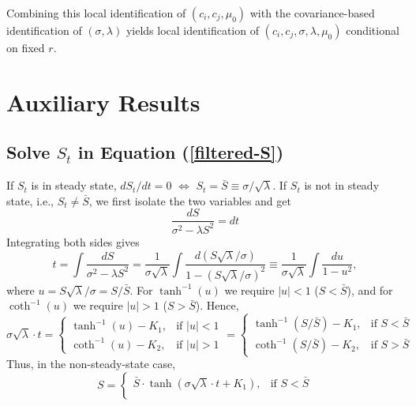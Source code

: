 \documentclass[mnsc]{informs3}
\begin{document}
\begin{APPENDICES}
Combining this local identification of $(c_i,c_j,\mu_0)$ with the covariance-based identification of $(\sigma,\lambda)$ yields local identification of $(c_i,c_j,\sigma,\lambda,\mu_0)$ conditional on fixed $r$.
\Halmos
\endproof






\section{Auxiliary Results}

\subsection{Solve $S_t$ in Equation (\ref{filtered-S})}\label{app-S-equ}

If $S_t$ is in steady state, $dS_t/dt = 0$ $\Leftrightarrow$ $S_t = \bar{S} \equiv \sigma/\sqrt{\lambda}$.
If $S_t$ is not in steady state, i.e., $S_t\neq\bar{S}$, we first isolate the two variables and get
\begin{equation*}
	\frac{dS}{\sigma^2-\lambda S^2} = dt
\end{equation*}
Integrating both sides gives
\begin{equation*}
    t = \int \frac{dS}{\sigma^2-\lambda S^2}
    = \frac{1}{\sigma\sqrt{\lambda}}
    \int \frac{d(S\sqrt{\lambda}/\sigma)}{1-(S\sqrt{\lambda}/\sigma)^2}
    \equiv \frac{1}{\sigma\sqrt{\lambda}}\int \frac{du}{1-u^2},
\end{equation*}
where $u = S\sqrt{\lambda}/\sigma = S/\bar{S}$.
For $\tanh^{-1}(u)$ we require $|u|<1$ ($S<\bar S$), and for $\coth^{-1}(u)$ we require $|u|>1$ ($S>\bar S$).
Hence,
\begin{equation*}
    \sigma\sqrt{\lambda}\cdot t = \begin{cases}
        \tanh^{-1}(u)-K_1, & \text{if } |u|<1\\
        \coth^{-1}(u)-K_2, & \text{if } |u|>1
    \end{cases} = \begin{cases}
        \tanh^{-1}(S/\bar{S})-K_1, & \text{if } S<\bar{S}\\
        \coth^{-1}(S/\bar{S})-K_2, & \text{if } S>\bar{S}
\end{cases}
\end{equation*}
Thus, in the non-steady-state case,
\begin{equation*}
	S = \begin{cases}
		\bar{S}\cdot\tanh(\sigma\sqrt{\lambda}\cdot t + K_1), & \text{if } S<\bar{S}\\

\end{cases}
\end{equation*}
\end{APPENDICES}
\end{document}
